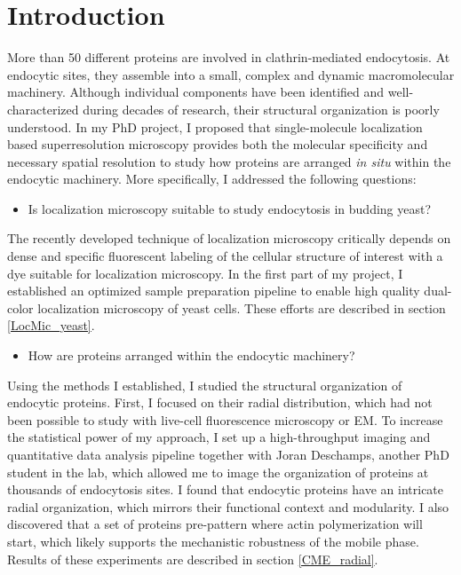 \chapter{Introduction} %

\label{Ch:Aims} %

More than 50 different proteins are involved in clathrin-mediated endocytosis. At endocytic sites, they assemble into a small, complex and dynamic macromolecular machinery. Although individual components have been identified and well-characterized during decades of research, their structural organization is poorly understood. In my PhD project, I proposed that single-molecule localization based superresolution microscopy provides both the molecular specificity and necessary spatial resolution to study how proteins are arranged \textit{in situ} within the endocytic machinery. More specifically, I addressed the following questions:

\begin{itemize}
	\item Is localization microscopy suitable to study endocytosis in budding yeast?
\end{itemize}

The recently developed technique of localization microscopy critically depends on dense and specific fluorescent labeling of the cellular structure of interest with a dye suitable for localization microscopy. In the first part of my project, I established an optimized sample preparation pipeline to enable high quality dual-color localization microscopy of yeast cells. These efforts are described in section \ref{LocMic_yeast}.

\begin{itemize}
	\item How are proteins arranged within the endocytic machinery?
\end{itemize}

Using the methods I established, I studied the structural organization of endocytic proteins. First, I focused on their radial distribution, which had not been possible to study with live-cell fluorescence microscopy or EM. To increase the statistical power of my approach, I set up a high-throughput imaging and quantitative data analysis pipeline together with Joran Deschamps, another PhD student in the lab, which allowed me to image the organization of proteins at thousands of endocytosis sites. I found that endocytic proteins have an intricate radial organization, which mirrors their functional context and modularity. I also discovered that a set of proteins pre-pattern where actin polymerization will start, which likely supports the mechanistic robustness of the mobile phase. Results of these experiments are described in section \ref{CME_radial}.

